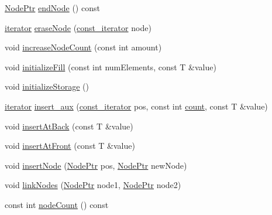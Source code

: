 \begin{DoxyCompactItemize}
\item 
\hyperlink{structprism_1_1_list_data_a6abedadad0342afa083fed664b90d474}{Node\+Ptr} \hyperlink{structprism_1_1_list_data_a7af2fdb88c5a243082f97db2de5f4ff1}{end\+Node} () const 
\item 
\hyperlink{structprism_1_1_list_data_a4bc53f6312c92f848fe93b2814904cff}{iterator} \hyperlink{structprism_1_1_list_data_a77760375a323a0465e9e2b1a7b8b9739}{erase\+Node} (\hyperlink{structprism_1_1_list_data_adf50481f89392e64eb3de1fbffd20c63}{const\+\_\+iterator} node)
\item 
void \hyperlink{structprism_1_1_list_data_ac41c5cd69f3bc5d5f47eff6bfbd775de}{increase\+Node\+Count} (const int amount)
\item 
void \hyperlink{structprism_1_1_list_data_ae643b4db14ddf30e1755c52527921e8c}{initialize\+Fill} (const int num\+Elements, const T \&value)
\item 
void \hyperlink{structprism_1_1_list_data_a5f86b0a4f328689689ca34724959436f}{initialize\+Storage} ()
\item 
\hyperlink{structprism_1_1_list_data_a4bc53f6312c92f848fe93b2814904cff}{iterator} \hyperlink{structprism_1_1_list_data_a2f8be1cf1b41cb0718f40bce947a2a7d}{insert\+\_\+aux} (\hyperlink{structprism_1_1_list_data_adf50481f89392e64eb3de1fbffd20c63}{const\+\_\+iterator} pos, const int \hyperlink{namespaceprism_a024117fc3639cdf6598509edf22f034a}{count}, const T \&value)
\item 
void \hyperlink{structprism_1_1_list_data_add952f9024e1fd388d37ad0f8d405d77}{insert\+At\+Back} (const T \&value)
\item 
void \hyperlink{structprism_1_1_list_data_ae3ef46d5d6029a839aa61c52ba5d7c7f}{insert\+At\+Front} (const T \&value)
\item 
void \hyperlink{structprism_1_1_list_data_ab8c0ce576a947a78b6902a1bf6d4e426}{insert\+Node} (\hyperlink{structprism_1_1_list_data_a6abedadad0342afa083fed664b90d474}{Node\+Ptr} pos, \hyperlink{structprism_1_1_list_data_a6abedadad0342afa083fed664b90d474}{Node\+Ptr} new\+Node)
\item 
void \hyperlink{structprism_1_1_list_data_af7649d44980880484bdd635e4f449811}{link\+Nodes} (\hyperlink{structprism_1_1_list_data_a6abedadad0342afa083fed664b90d474}{Node\+Ptr} node1, \hyperlink{structprism_1_1_list_data_a6abedadad0342afa083fed664b90d474}{Node\+Ptr} node2)
\item 
const int \hyperlink{structprism_1_1_list_data_a59875d493ad4105f06de9f5aebd27349}{node\+Count} () const 
\item 

\end{DoxyCompactItemize}
